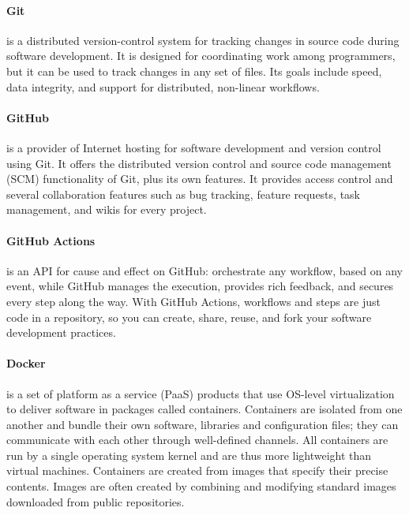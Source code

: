 \paragraph{Git}
is a distributed version-control system for tracking changes in source code during software development.
It is designed for coordinating work among programmers, but it can be used to track changes in any set of files.
Its goals include speed, data integrity, and support for distributed, non-linear workflows.

\paragraph{GitHub}
is a provider of Internet hosting for software development and version control using Git.
It offers the distributed version control and source code management (SCM) functionality of Git,
plus its own features.
It provides access control and several collaboration features such as bug tracking, feature requests, task management, and wikis for every project.

\paragraph{GitHub Actions}
is an API for cause and effect on GitHub: orchestrate any workflow, based on any event, while GitHub manages the execution, provides rich feedback, and secures every step along the way.
With GitHub Actions, workflows and steps are just code in a repository, so you can create, share, reuse, and fork your software development practices.

\paragraph{Docker}
is a set of platform as a service (PaaS) products that use OS-level virtualization to deliver software in packages called containers.
Containers are isolated from one another and bundle their own software, libraries and configuration files;
they can communicate with each other through well-defined channels.
All containers are run by a single operating system kernel and are thus more lightweight than virtual machines.
Containers are created from images that specify their precise contents.
Images are often created by combining and modifying standard images downloaded from public repositories.
